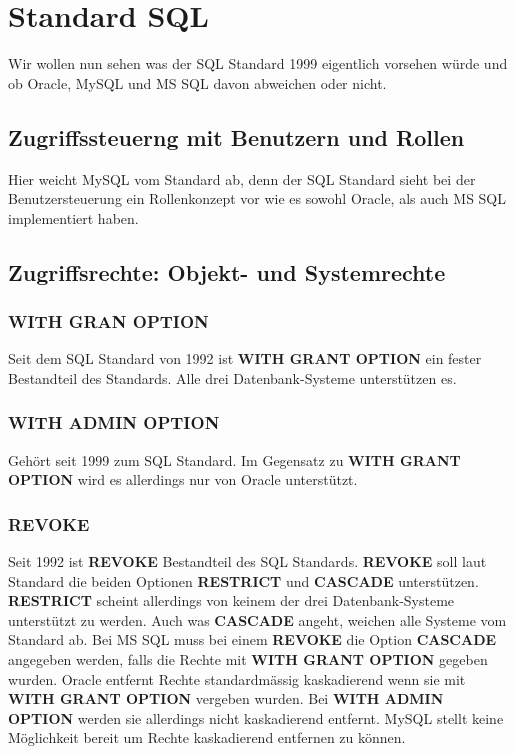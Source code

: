 \documentclass[10pt]{scrreprt}
\newcommand{\Bold}[1]{\textbf{#1}} %
\begin{document}
\section{Standard SQL}
Wir wollen nun sehen was der SQL Standard 1999 eigentlich vorsehen würde und ob Oracle, MySQL und MS SQL davon abweichen oder nicht.
\subsection{Zugriffssteuerng mit Benutzern und Rollen}
Hier weicht MySQL vom Standard ab, denn der SQL Standard sieht bei der Benutzersteuerung ein Rollenkonzept vor wie es sowohl Oracle, als auch MS SQL implementiert haben.
\subsection{Zugriffsrechte: Objekt- und Systemrechte}
\subsubsection{WITH GRAN OPTION}
Seit dem SQL Standard von 1992 ist \Bold{WITH GRANT OPTION} ein fester Bestandteil des Standards. Alle drei Datenbank-Systeme unterstützen es.
\subsubsection{WITH ADMIN OPTION}
Gehört seit 1999 zum SQL Standard. Im Gegensatz zu \Bold{WITH GRANT OPTION} wird es allerdings nur von Oracle unterstützt.
\subsubsection{REVOKE}
Seit 1992 ist \Bold{REVOKE} Bestandteil des SQL Standards.\newline\newline
\Bold{REVOKE} soll laut Standard die beiden Optionen \Bold{RESTRICT} und \Bold{CASCADE} unterstützen. \Bold{RESTRICT} scheint allerdings von keinem der drei Datenbank-Systeme unterstützt zu werden. Auch was \Bold{CASCADE} angeht, weichen alle Systeme vom Standard ab.\newline\newline
Bei MS SQL muss bei einem \Bold{REVOKE} die Option \Bold{CASCADE} angegeben werden, falls die Rechte mit \Bold{WITH GRANT OPTION} gegeben wurden.\newline\newline
Oracle entfernt Rechte standardmässig kaskadierend wenn sie mit \Bold{WITH GRANT OPTION} vergeben wurden. Bei \Bold{WITH ADMIN OPTION} werden sie allerdings nicht kaskadierend entfernt.\newline\newline
MySQL stellt keine Möglichkeit bereit um Rechte kaskadierend entfernen zu können.
\end{document}
